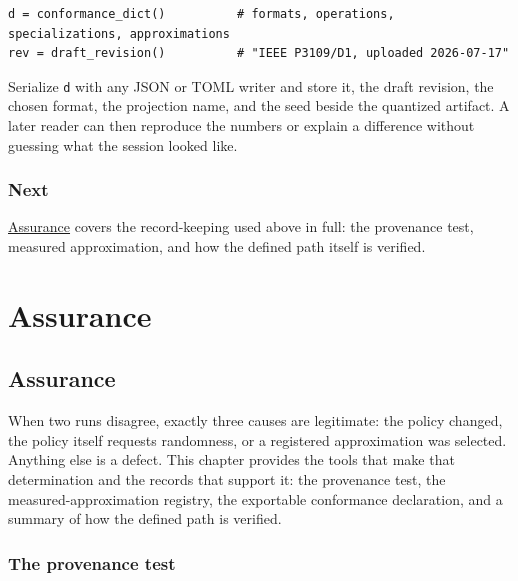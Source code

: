 \label{12845234384692473716}{}



\begin{verbatim}
d = conformance_dict()          # formats, operations, specializations, approximations
rev = draft_revision()          # "IEEE P3109/D1, uploaded 2026-07-17"
\end{verbatim}



Serialize \texttt{d} with any JSON or TOML writer and store it, the draft revision, the chosen format, the projection name, and the seed beside the quantized artifact. A later reader can then reproduce the numbers or explain a difference without guessing what the session looked like.



\section{Next}



\label{9862256287407127426}{}


\href{assurance.md}{Assurance} covers the record-keeping used above in full: the provenance test, measured approximation, and how the defined path itself is verified.



\part{Assurance}


\chapter{Assurance}



\label{14478627307656753823}{}


When two runs disagree, exactly three causes are legitimate: the policy changed, the policy itself requests randomness, or a registered approximation was selected. Anything else is a defect. This chapter provides the tools that make that determination and the records that support it: the provenance test, the measured-approximation registry, the exportable conformance declaration, and a summary of how the defined path is verified.



\section{The provenance test}



